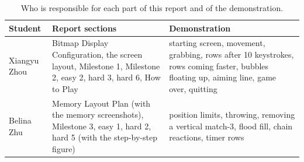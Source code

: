 \documentclass[11pt]{article}
\begin{document}
\begin{table}[H]
\centering
\small
\begin{tabular}{@{}>{\raggedright\arraybackslash}p{2.1cm}>{\raggedright\arraybackslash}p{7.0cm}>{\raggedright\arraybackslash}p{5.6cm}@{}}
\toprule
Student & Report sections & Demonstration\\
\midrule
Xiangyu Zhou & Bitmap Display Configuration, the screen layout, Milestone 1,
Milestone 2, easy 2, hard 3, hard 6, How to Play & starting screen,
movement, grabbing, rows after 10 keystrokes, rows coming faster, bubbles
floating up, aiming line, game over, quitting\\
\addlinespace
Belina Zhu & Memory Layout Plan (with the memory screenshots), Milestone 3,
easy 1, hard 2, hard 5 (with the step-by-step figure) & position limits,
throwing, removing a vertical match-3, flood fill, chain reactions, timer
rows\\
\bottomrule
\end{tabular}
\caption{Who is responsible for each part of this report and of the
demonstration.}
\label{tab:attribution-report}
\end{table}
\end{document}
